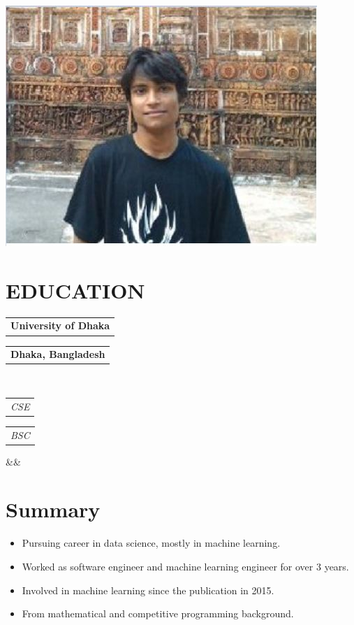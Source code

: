 \documentclass[11pt,a4paper,roman]{moderncv}
\makeatletter
\newcommand*{\customcventry}[7][.25em]{
  \begin{tabular}{@{}l} 
    {\bfseries #4}
  \end{tabular}
  \hfill%
  \begin{tabular}{l@{}}
     {\bfseries #5}
  \end{tabular} \\
  \begin{tabular}{@{}l} 
    {\itshape #3}
  \end{tabular}
  \hfill%
  \begin{tabular}{l@{}}
     {\itshape #2}
  \end{tabular}
  \ifx&#7&%
  \else{\\%
    \begin{minipage}{\maincolumnwidth}%
      \small#7%
    \end{minipage}}\fi%
  \par\addvspace{#1}}
\makeatother
\begin{document}

\makecvtitle
\vspace{-.2in}
\begin{center}
	\includegraphics[scale=.2]{pp1}
\end{center}
\vspace*{-.2in}

\section{EDUCATION}
{\customcventry{BSC}{CSE}{University of Dhaka}{Dhaka, Bangladesh}{}{}}

\section{Summary}
{
\begin{itemize}
	\item Pursuing career in data science, mostly in machine learning.
	\item Worked as software engineer and machine learning engineer for over 3 years.
	\item Involved in machine learning since the publication in 2015.
	\item From mathematical and competitive programming background.
\end{itemize}
}
\end{document}
